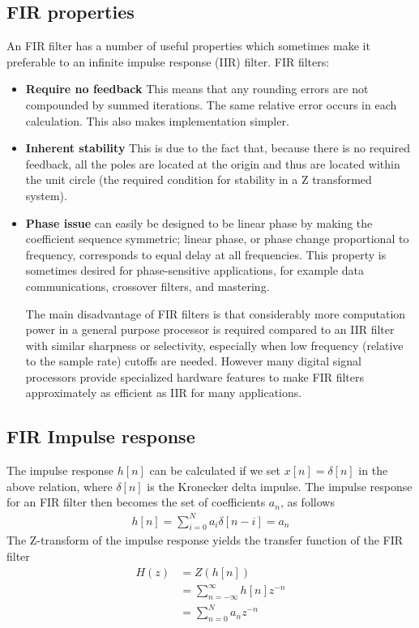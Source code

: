 \documentclass[conference]{IEEEtran}
\begin{document}
\subsection{FIR properties}
An FIR filter has a number of useful properties which sometimes make it preferable to an infinite impulse response (IIR) filter. FIR filters:
\begin{itemize}
\item\textbf{Require no feedback} This means that any rounding errors are not compounded by summed iterations. The same relative error occurs in each calculation. This also makes implementation simpler.
\item\textbf{Inherent stability} This is due to the fact that, because there is no required feedback, all
the poles are located at the origin and thus are located within the unit circle (the required condition for stability in a Z transformed system).
\item\textbf{Phase issue} can easily be designed to be linear phase by making the coefficient sequence symmetric; linear phase, or phase change proportional to frequency, corresponds to equal delay at all frequencies. This property is sometimes desired for phase-sensitive applications, for example data communications, crossover filters, and mastering.

The main disadvantage of FIR filters is that considerably more computation power in a general purpose processor is required compared to an IIR filter with similar sharpness or selectivity, especially when low frequency (relative to the sample rate) cutoffs are needed. However many digital signal processors provide specialized hardware features to make FIR filters approximately as efficient as IIR for many applications.
\end{itemize}

\subsection{FIR Impulse response}
The impulse response $h[n]$ can be calculated if we set $x[n] = \delta[n]$ in the above relation, where $\delta[n]$ is the Kronecker delta impulse. The impulse response for an FIR filter then becomes the set of coefficients $a_n$, as follows
\begin{align}
h[n] = \sum_{i=0}^{N}a_i\delta[n-i] = a_n
\end{align}
The Z-transform of the impulse response yields the transfer function of the FIR filter
\begin{align}
H(z) &= Z(h[n])\\
	 &= \sum_{n=-\infty}^{\infty}h[n]z^{-n}\\
	 &= \sum_{n=0}^{N}a_nz^{-n}
\end{align}\\
\end{document}
